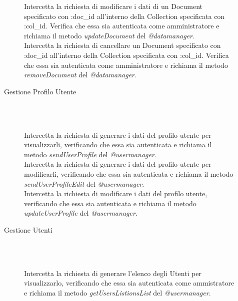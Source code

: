 \begin{description}
\begin{description}
\begin{mldescription}
  Intercetta la richiesta di modificare i dati di un Document specificato con :doc\_id all'interno della Collection specificata con :col\_id. Verifica che essa sia autenticata come amministratore e richiama il metodo \textit{updateDocument} del \textit{@datamanager}.
   \hfill \\
  Intercetta la richiesta di cancellare un Document specificato con :doc\_id all'interno della Collection specificata con :col\_id. Verifica che essa sia autenticata come amministratore e richiama il metodo \textit{removeDocument} del \textit{@datamanager}.
 \end{mldescription}
 \item[Gestione Profilo Utente] \hfill \\
 \begin{mldescription}
   \hfill \\
    Intercetta la richiesta di generare i dati del profilo utente per visualizzarli, verificando che essa sia autenticata e richiama il metodo \textit{sendUserProfile} del \textit{@usermanager}.
    \hfill \\
   Intercetta la richiesta di generare i dati del profilo utente per modificarli, verificando che essa sia autenticata e richiama il metodo \textit{sendUserProfileEdit} del \textit{@usermanager}.
    \hfill \\
   Intercetta la richiesta di modificare i dati del profilo utente, verificando che essa sia autenticata e richiama il metodo \textit{updateUserProfile} del \textit{@usermanager}.
 \end{mldescription}  
 \item[Gestione Utenti] \hfill \\
  \begin{mldescription}
     \hfill \\
	 Intercetta la richiesta di generare l'elenco degli Utenti per visualizzarlo, verificando che essa sia autenticata come ammistratore e richiama il metodo \textit{getUsersListionsList} del \textit{@usermanager}.

\end{mldescription}
\end{description}
\end{description}
